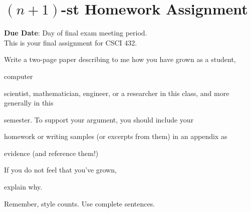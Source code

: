 \documentclass{article}
\begin{document}
\section*{$(n+1)$-st Homework Assignment}



{\bf{Due Date}}: Day of final exam meeting period.\\



This is your final assignment for CSCI 432.



Write a two-page paper describing to me how you have grown as a student,

computer

scientist, mathematician, engineer, or a researcher in this class, and more generally
 in this

semester.  To support your argument, you should include your

homework or writing samples (or excerpts from them) in an appendix as

evidence (and reference them!)



If you do not feel that you've grown,

explain why.



Remember, style counts. Use complete sentences.
\end{document}
